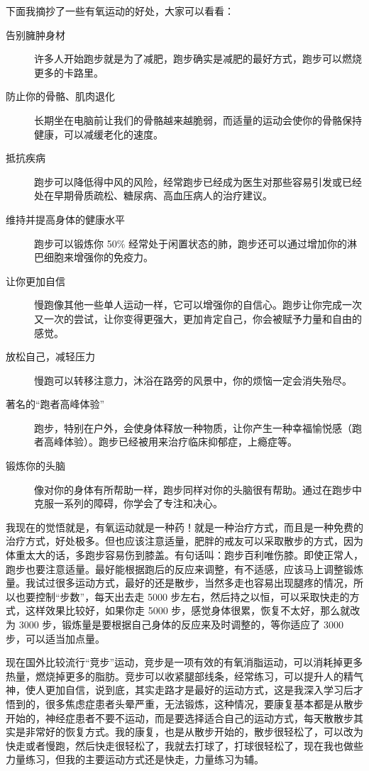 \documentclass[fontset=founder]{ctexart}
\begin{document}
下面我摘抄了一些有氧运动的好处，大家可以看看：

\begin{description}
    \item[告别臃肿身材] 许多人开始跑步就是为了减肥，跑步确实是减肥的最好方式，跑步可以燃烧更多的卡路里。
    \item[防止你的骨骼、肌肉退化] 长期坐在电脑前让我们的骨骼越来越脆弱，而适量的运动会使你的骨骼保持健康，可以减缓老化的速度。
    \item[抵抗疾病] 跑步可以降低得中风的风险，经常跑步已经成为医生对那些容易引发或已经处在早期骨质疏松、糖尿病、高血压病人的治疗建议。
    \item[维持并提高身体的健康水平] 跑步可以锻炼你 50\% 经常处于闲置状态的肺，跑步还可以通过增加你的淋巴细胞来增强你的免疫力。
    \item[让你更加自信] 慢跑像其他一些单人运动一样，它可以增强你的自信心。跑步让你完成一次又一次的尝试，让你变得更强大，更加肯定自己，你会被赋予力量和自由的感觉。
    \item[放松自己，减轻压力] 慢跑可以转移注意力，沐浴在路旁的风景中，你的烦恼一定会消失殆尽。
    \item[著名的“跑者高峰体验”] 跑步，特别在户外，会使身体释放一种物质，让你产生一种幸福愉悦感（跑者高峰体验）。跑步已经被用来治疗临床抑郁症，上瘾症等。
    \item[锻炼你的头脑] 像对你的身体有所帮助一样，跑步同样对你的头脑很有帮助。通过在跑步中克服一系列的障碍，你学会了专注和决心。
\end{description}

我现在的觉悟就是，有氧运动就是一种药！就是一种治疗方式，而且是一种免费的治疗方式，好处极多。但也应该注意适量，肥胖的戒友可以采取散步的方式，因为体重太大的话，多跑步容易伤到膝盖。有句话叫：跑步百利唯伤膝。即使正常人，跑步也要注意适量。最好能根据跑后的反应来调整，有不适感，应该马上调整锻炼量。我试过很多运动方式，最好的还是散步，当然多走也容易出现腿疼的情况，所以也要控制“步数”，每天出去走 5000 步左右，然后持之以恒，可以采取快走的方式，这样效果比较好，如果你走 5000 步，感觉身体很累，恢复不太好，那么就改为 3000 步，锻炼量是要根据自己身体的反应来及时调整的，等你适应了 3000 步，可以适当加点量。

现在国外比较流行“竞步”运动，竞步是一项有效的有氧消脂运动，可以消耗掉更多热量，燃烧掉更多的脂肪。竞步可以收紧腿部线条，经常练习，可以提升人的精气神，使人更加自信，说到底，其实走路才是最好的运动方式，这是我深入学习后才悟到的，很多焦虑症患者头晕严重，无法锻炼，这种情况，要康复基本都是从散步开始的，神经症患者不要不运动，而是要选择适合自己的运动方式，每天散散步其实是非常好的恢复方式。我的康复，也是从散步开始的，散步很轻松了，可以改为快走或者慢跑，然后快走很轻松了，我就去打球了，打球很轻松了，现在我也做些力量练习，但我的主要运动方式还是快走，力量练习为辅。
\end{document}
